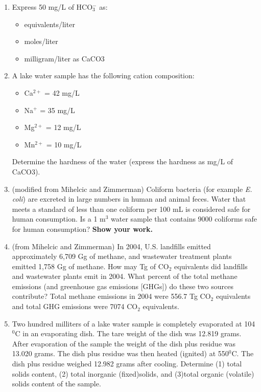 \documentclass[12pt,letterpaper]{article}
\begin{document}
\begin{enumerate}
\item 	Express 50 mg/L of  HCO$_3^-$ as:
\begin{itemize}
\item equivalents/liter
\item moles/liter
\item 	milligram/liter as CaCO3
\end{itemize}

\item A lake water sample has the following cation composition:
\begin{itemize}
\item Ca$^{2+}$ = 42 mg/L
\item Na$^{+}$ = 35 mg/L
\item Mg$^{2+}$ = 12 mg/L
\item Mn$^{2+}$ = 10 mg/L
\end{itemize}
Determine the hardness of the water (express the hardness as mg/L of CaCO3).
 
\item (modified from Mihelcic and Zimmerman) Coliform bacteria (for example \emph{E. coli}) are excreted in large numbers in human and animal feces.  Water that meets a standard of less than one coliform per 100 mL is considered safe for human consumption.  Is a 1 m$^3$ water sample that contains 9000 coliforms safe for human consumption?  \textbf{Show your work.}


\item (from Mihelcic and Zimmerman) In 2004, U.S. landfills emitted approximately 6,709 Gg of methane, and wastewater treatment plants emitted 1,758 Gg of methane.  How may Tg  of CO$_2$ equivalents did landfills and wastewater plants emit in 2004.  What percent of the total methane emissions (and greenhouse gas emissions [GHGs]) do these two sources contribute? Total methane emissions in 2004 were 556.7 Tg CO$_2$ equivalents and total GHG emissions were 7074 CO$_2$ equivalents. 


\item Two hundred milliters of a lake water sample is completely evaporated at 104$^0$C in an evaporating dish.  The tare weight of the dish was 12.819 grams.  After evaporation of the sample the weight of the dish plus residue was 13.020 grams.  The dish plus residue was then heated (ignited) at 550$^0$C.  The dish plus residue weighed 12.982 grams after cooling.  Determine (1) total solids content, (2) total inorganic (fixed)solids, and (3)total organic (volatile) solids content of the sample. 


\end{enumerate}
\end{document}
